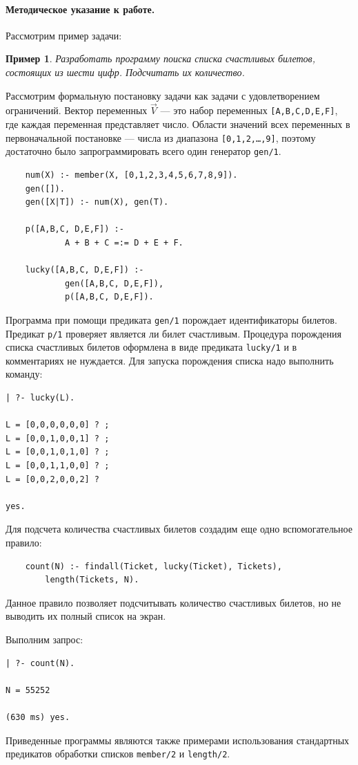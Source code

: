 \documentclass[12pt, openany, oneside]{book} %
\newtheorem{example}{Пример}[chapter]
\begin{document}
\paragraph{Методическое указание к работе.}
Рассмотрим пример задачи:
\begin{example}
Разработать программу поиска списка счастливых билетов, состоящих из шести цифр. Подсчитать их количество.
\end{example}


Рассмотрим формальную постановку задачи как задачи с удовлетворением ограничений. Вектор переменных $\vec{V}$ --- это набор переменных \texttt{[A,B,C,D,E,F]}, где каждая переменная представляет число. Области значений всех переменных в первоначальной постановке --- числа из диапазона \texttt{[0,1,2,\ldots,9]}, поэтому достаточно было запрограммировать всего один генератор \texttt{gen/1}.

{\tt\begin{verbatim}
    num(X) :- member(X, [0,1,2,3,4,5,6,7,8,9]).
    gen([]).
    gen([X|T]) :- num(X), gen(T).

    p([A,B,C, D,E,F]) :-
            A + B + C =:= D + E + F.

    lucky([A,B,C, D,E,F]) :-
            gen([A,B,C, D,E,F]),
            p([A,B,C, D,E,F]).
\end{verbatim}}

Программа при помощи предиката \texttt{gen/1} порождает идентификаторы билетов. Предикат \texttt{p/1} проверяет является ли билет счастливым. Процедура порождения списка счастливых билетов оформлена в виде предиката \texttt{lucky/1} и в комментариях не нуждается. Для запуска порождения списка надо выполнить команду:
{\tt\begin{verbatim}
| ?- lucky(L).

L = [0,0,0,0,0,0] ? ;
L = [0,0,1,0,0,1] ? ;
L = [0,0,1,0,1,0] ? ;
L = [0,0,1,1,0,0] ? ;
L = [0,0,2,0,0,2] ?

yes.
\end{verbatim}}
Для подсчета количества счастливых билетов создадим еще одно вспомогательное правило:
{\tt\begin{verbatim}
    count(N) :- findall(Ticket, lucky(Ticket), Tickets),
        length(Tickets, N).
\end{verbatim}}
\noindent{}Данное правило позволяет подсчитывать количество счастливых билетов, но не выводить их полный список на экран.

Выполним запрос:
{\tt\begin{verbatim}
| ?- count(N).

N = 55252

(630 ms) yes.
\end{verbatim}}
\noindent{}Приведенные программы являются также примерами использования стандартных предикатов обработки списков \texttt{member/2} и \texttt{length/2}.
\end{document}
